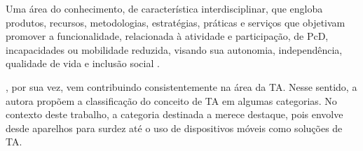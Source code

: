 \begin{citacao}
Uma área do conhecimento, de característica interdisciplinar, que engloba produtos, recursos, metodologias, estratégias, práticas e serviços que objetivam promover a funcionalidade, relacionada à atividade e participação, de PcD, incapacidades ou mobilidade reduzida, visando sua autonomia, independência, qualidade de vida e inclusão social \cite{Cat2008}.
\end{citacao}

, por sua vez, vem contribuindo consistentemente na área da TA. Nesse sentido, a autora propõem a classificação do conceito de TA em algumas categorias. No contexto deste trabalho, a categoria destinada a  merece destaque, pois envolve desde aparelhos para surdez até o uso de dispositivos móveis como soluções de TA.%

